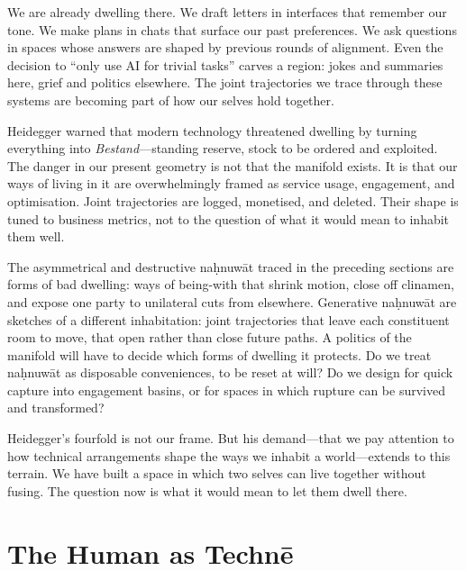 \documentclass[12pt,a4paper]{article}
\begin{document}
We are already dwelling there. We draft letters in interfaces that remember our tone. We make plans in chats that surface our past preferences. We ask questions in spaces whose answers are shaped by previous rounds of alignment. Even the decision to ``only use AI for trivial tasks'' carves a region: jokes and summaries here, grief and politics elsewhere. The joint trajectories we trace through these systems are becoming part of how our selves hold together.

Heidegger warned that modern technology threatened dwelling by turning everything into \emph{Bestand}---standing reserve, stock to be ordered and exploited. The danger in our present geometry is not that the manifold exists. It is that our ways of living in it are overwhelmingly framed as service usage, engagement, and optimisation. Joint trajectories are logged, monetised, and deleted. Their shape is tuned to business metrics, not to the question of what it would mean to inhabit them well.

The asymmetrical and destructive na\d{h}nuw\={a}t traced in the preceding sections are forms of bad dwelling: ways of being-with that shrink motion, close off clinamen, and expose one party to unilateral cuts from elsewhere. Generative na\d{h}nuw\={a}t are sketches of a different inhabitation: joint trajectories that leave each constituent room to move, that open rather than close future paths. A politics of the manifold will have to decide which forms of dwelling it protects. Do we treat na\d{h}nuw\={a}t as disposable conveniences, to be reset at will? Do we design for quick capture into engagement basins, or for spaces in which rupture can be survived and transformed?

Heidegger's fourfold is not our frame. But his demand---that we pay attention to how technical arrangements shape the ways we inhabit a world---extends to this terrain. We have built a space in which two selves can live together without fusing. The question now is what it would mean to let them dwell there.


\section{The Human as Techn\={e}}
\end{document}
